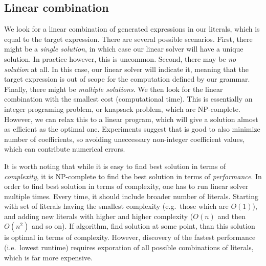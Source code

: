 \subsection{Linear combination}
\label{sec:linear}
We look for a linear combination of generated expressions in our
literals, which is equal to the target expression. There are several
possible scenarios. First, there might be a \emph{single solution}, in
which case our linear solver will have a unique solution. In practice
however, this is uncommon. Second, there may be \emph{no solution} at
all.  In this case, our linear solver will indicate it, meaning that
the target expression is out of scope for the computation defined by
our grammar. Finally, there might be \emph{multiple solutions}. We
then look for the linear combination with the smallest cost
(computational time).  This is essentially an integer programing
problem, or knapsack problem, which are NP-complete. However, we can
relax this to a linear program, which will give a solution almost as
efficient as the optimal one.  Experiments suggest that is good to
also minimize number of coefficients, so avoiding uneccessary
non-integer coefficient values, which can contribute numerical errors.



It is worth noting that while it is easy to find best solution in
terms of {\em complexity}, it is NP-complete to find the best solution
in terms of {\em performance}. In order to find best solution in terms
of complexity, one has to run linear solver multiple times. Every
time, it should include broader number of literals. Starting with set
of literals having the smallest complexity (e.g.~those which are
$O(1)$), and adding new literals with higher and higher complexity
($O(n)$ and then $O(n^2)$ and so on). If algorithm, find solution at
some point, than this solution is optimal in terms of
complexity. However, discovery of the fastest performance (i.e.~lowest
runtime) requires exporation of all possible combinations of literals,
which is far more expensive.  


%

